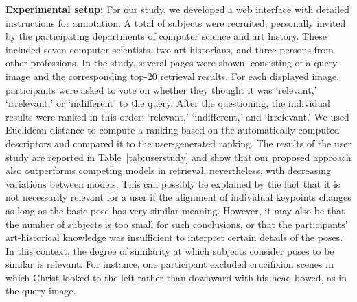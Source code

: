 \documentclass[sigconf]{acmart}
\begin{document}
\textbf{Experimental setup:} For our study, we developed a web interface with detailed instructions for annotation.
A total of  subjects were recruited, personally invited by the participating departments of computer science and art history.
These included seven computer scientists, two art historians, and three persons from other professions. 
In the study, several pages were shown, consisting of a query image and the corresponding top-20 retrieval results. For each displayed image, participants were asked to vote on whether they thought it was \enquote*{relevant,} \enquote*{irrelevant,} or \enquote*{indifferent} to the query. 
After the questioning, the individual results were ranked in this order: \enquote*{relevant,} \enquote*{indifferent,} and \enquote*{irrelevant.}
We used Euclidean distance to compute a ranking based on the automatically computed descriptors and compared it to the user-generated ranking. 
The results of the user study are reported in Table~\ref{tab:userstudy} and show that our proposed approach also outperforms competing models in retrieval, nevertheless, with decreasing variations between models. 
This can possibly be explained by the fact that it is not necessarily relevant for a user if the alignment of individual keypoints changes as long as the basic pose has very similar meaning. 
However, it may also be that the number of subjects is too small for such conclusions, or that the participants' art-historical knowledge was insufficient to interpret certain details of the poses. 
In this context, the degree of similarity at which subjects consider poses to be similar is relevant. For instance, one participant excluded crucifixion scenes in which Christ looked to the left rather than downward with his head bowed, as in the query image. 
\end{document}
